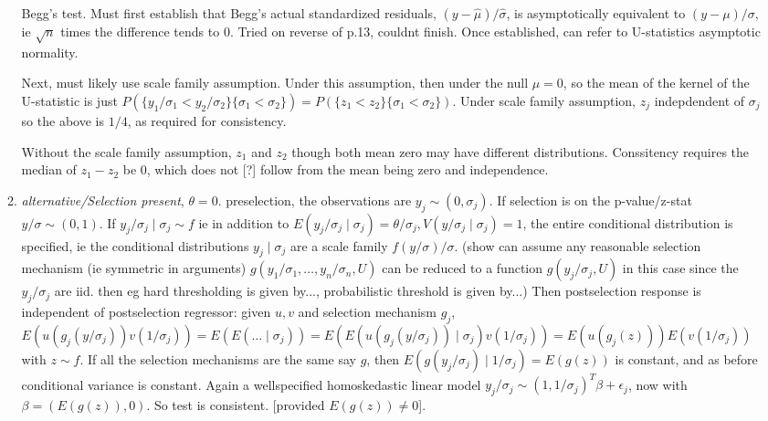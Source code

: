 \documentclass{article}
\newcommand{\gm}{\theta}
\newcommand{\E}{E}
\renewcommand{\P}{P}
\newcommand{\V}{V}
\begin{document}
\begin{enumerate}
\begin{enumerate}
  Begg's test. %
  Must first establish that Begg's actual standardized residuals,
  $(y-\hat{\mu})/\hat{\sigma}$, is asymptotically equivalent to
  $(y-\mu)/\sigma$, ie $\sqrt{n}$ times the difference tends to
  $0$. Tried on reverse of p.13, couldnt finish. Once established, can
  refer to U-statistics asymptotic normality.

  Next, must likely use scale family assumption. Under this
  assumption, then under the null $\mu=0$, so the mean of the kernel
  of the U-statistic is just
  $\P(\{y_1/\sigma_1<y_2/\sigma_2\}\{\sigma_1<\sigma_2\})=\P(\{z_1<z_2\}\{\sigma_1<\sigma_2\})$. Under
  scale family assumption, $z_j$ indepdendent of $\sigma_j$ so the
  above is $1/4$, as required for consistency.

  Without the scale family assumption, $z_1$ and $z_2$ though both
  mean zero may have different distributions. Conssitency requires the
  median of $z_1-z_2$ be $0$, which does not [?] follow from the mean
  being zero and independence.



  
 \item \emph{alternative/Selection present}, $\gm=0$. preselection, the observations are
  $y_j\sim (0,\sigma_j)$. If selection is on the p-value/z-stat
  $y/\sigma\sim (0,1)$. If $y_j/\sigma_j\mid\sigma_j \sim f$ ie in
  addition to
  $\E(y_j/\sigma_j\mid\sigma_j)=\gm/\sigma_j,\V(y/\sigma_j\mid\sigma_j)=1$,
  the entire conditional distribution is specified, ie the conditional
  distributions $y_j\mid\sigma_j$ are a scale family
  $f(y/\sigma)/\sigma$. (show can assume any reasonable selection mechanism (ie symmetric in arguments)
  $g(y_1/\sigma_1,\ldots,y_n/\sigma_n,U)$ can be reduced to a function
  $g(y_j/\sigma_j,U)$ in this case since the $y_j/\sigma_j$ are
  iid. then eg hard thresholding is given by..., probabilistic threshold
  is given by...) Then postselection response is independent of
  postselection regressor: given $u,v$ and selection mechanism $g_j$,
  $E(u(g_j(y/\sigma_j))v(1/\sigma_j))=E(E(\ldots\mid\sigma_j))=E(E(u(g_j(y/\sigma_j))\mid\sigma_j)v(1/\sigma_j))=E(u(g_j(z)))E(v(1/\sigma_j))$
  with $z\sim f$.
  If all the selection mechanisms are the same say $g$, then
  $E(g(y_j/\sigma_j)\mid1/\sigma_j)=E(g(z))$ is constant, and as before
  conditional variance is constant. Again a wellspecified homoskedastic
  linear model $y_j/\sigma_j \sim (1,1/\sigma_j)^T\beta+\epsilon_j$, now
  with $\beta=(\E(g(z)),0)$. So test is consistent. [provided $\E(g(z))\neq 0$].


\end{enumerate}
\end{enumerate}
\end{document}

